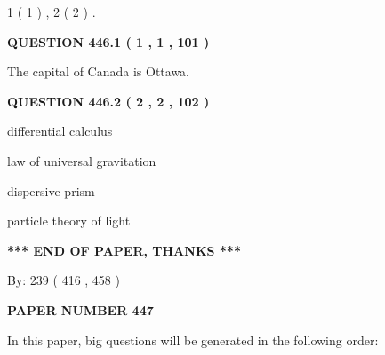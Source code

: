 \documentclass[12pt]{article}
\begin{document}
   
   1 ( 1 )
 ,
   2 ( 2 )
 .
  
\vspace{0.2in}
  
{\textbf{\Large{QUESTION
446.1 
 ( 1 , 1 , 101 )
}}}
  
  
 
 
\noindent{}
 
 
The capital of Canada is Ottawa.
 
 
 
 
  
\vspace{0.2in}
  
{\textbf{\Large{QUESTION
446.2 
 ( 2 , 2 , 102 )
}}}
  
  
 
 
\noindent{}
 
 
differential calculus
 
 
law of universal gravitation
 
 
dispersive prism
 
 
particle theory of light
 
 
 
 
   
   
\vspace{1.0in} 
{\textbf{\large{ *** END OF PAPER, THANKS *** }}} 
   
   
\hspace{1.0in} By: 
 239 ( 416 ,  458 )
   
   
   
   
\newpage 
\setcounter{page}{ 
   447001 } 
   
   
   
   
 {\textbf{ \Large{ PAPER NUMBER  447  }}}
   
   
\vspace{0.2in}
   
   
   
   
   
\vspace{0.2in}
   
In this paper, big questions will be generated in the following order: 
   
\end{document}
